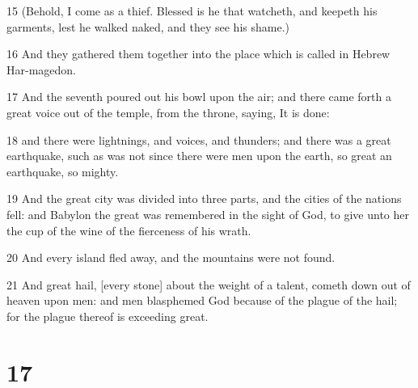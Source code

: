\par 15 (Behold, I come as a thief. Blessed is he that watcheth, and keepeth his garments, lest he walked naked, and they see his shame.)
\par 16 And they gathered them together into the place which is called in Hebrew Har-magedon.
\par 17 And the seventh poured out his bowl upon the air; and there came forth a great voice out of the temple, from the throne, saying, It is done:
\par 18 and there were lightnings, and voices, and thunders; and there was a great earthquake, such as was not since there were men upon the earth, so great an earthquake, so mighty.
\par 19 And the great city was divided into three parts, and the cities of the nations fell: and Babylon the great was remembered in the sight of God, to give unto her the cup of the wine of the fierceness of his wrath.
\par 20 And every island fled away, and the mountains were not found.
\par 21 And great hail, [every stone] about the weight of a talent, cometh down out of heaven upon men: and men blasphemed God because of the plague of the hail; for the plague thereof is exceeding great.

\chapter{17}

